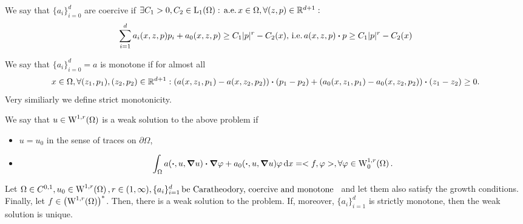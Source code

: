\documentclass{article}
\begin{document}
\begin{definition}[Coercivity]
	We say that $\{a_i\}_{i=0}^d$ are coercive if $\exists C_1 > 0, C_2 \in \LpSet[1]{\Omega}: \, \text{a.e.} \, x \in \Omega, \forall (z,p) \in \R^{d+1}:$
	\[
		\sum_{i=1}^d a_i\qty(x,z,p)p_i + a_0\qty(x,z,p) \geq C_1 |p|^r-C_2(x), \, \text{i.e.} \, a\qty(x,z,p) \vdot p \geq C_1 |p|^r - C_2(x)
	\]
\end{definition}

\begin{definition}[Monotonicity]
	We say that $\{a_i\}_{i=0}^d = a$ is monotone if for almost all
	\[
		x \in \Omega, \forall (z_1,p_1), (z_2,p_2) \in \R^{d+1}: \qty(a\qty(x,z_1,p_1)-a\qty(x,z_2,p_2))\vdot (p_1 - p_2) + (a_0\qty(x,z_1,p_1)-a_0\qty(x,z_2,p_2))\vdot (z_1 - z_2) \geq 0.
	\]
	Very similiarly we define strict monotonicity.
\end{definition}

\begin{definition}
	We say that $u \in \WkpSet[1][r]{\Omega}$ is a weak solution to the above problem if
	\begin{itemize}
		\item $u = u_0$ in the sense of traces on $\partial \Omega$,
		\item
			\[
				\int_{\Omega}a\qty(\vdot, u, \grad u)\vdot \grad \varphi +a_0\qty(\vdot, u, \grad u) \varphi \dd{x} = <f,\varphi>, \forall \varphi \in \WkpzeroSet[1][r]{\Omega}.
			\]
	\end{itemize}
\end{definition}

\begin{theorem}
	Let $\Omega \in C^{0,1}, u_0 \in \WkpSet[1][r]{\Omega}, r \in (1,\infty), \{a_i\}_{i=1}^d \, \text{be Caratheodory, coercive and monotone } \,$ and let them also satisfy the growth conditions. Finally, let $f \in \qty(\WkpSet[1][r]{\Omega})^{*}$. Then, there is a weak solution to the problem.
	If, moreover, $\{a_i\}_{i=1}^d$ is strictly monotone, then the weak solution is unique.
\end{theorem}
\end{document}
